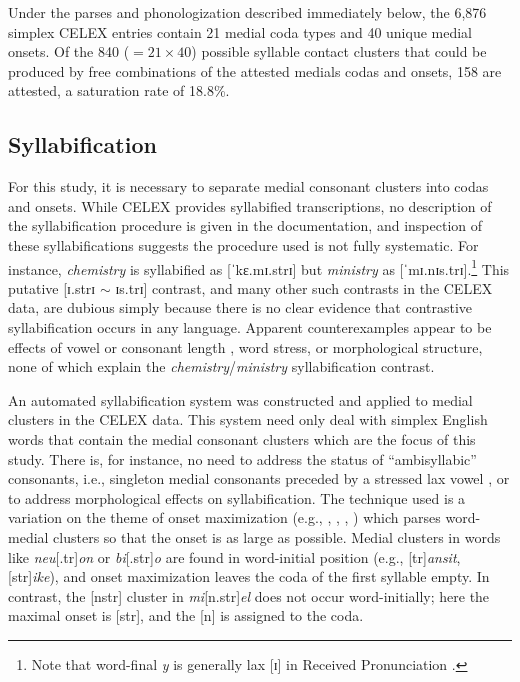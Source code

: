 \citet{Halle1962}


Under the parses and phonologization described immediately below, the 6,876 simplex CELEX entries contain 21 medial coda types and 40 unique medial onsets. Of the 840 ($= 21 \times 40$) possible syllable contact clusters that could be produced by free combinations of the attested medials codas and onsets, 158 are attested, a saturation rate of 18.8\%.

\subsection{Syllabification}

For this study, it is necessary to separate medial consonant clusters into codas and onsets. While CELEX provides syllabified transcriptions, no description of the syllabification procedure is given in the documentation, and inspection of these syllabifications suggests the procedure used is not fully systematic. For instance, \emph{chemistry} is syllabified as [ˈkɛ.mɪ.strɪ] but \emph{ministry} as [ˈmɪ.nɪs.trɪ].\footnote{Note that word-final \emph{y} is generally lax [ɪ] in Received Pronunciation \citep[][294]{AOE2}.} This putative [ɪ.strɪ $\sim$ ɪs.trɪ] contrast, and many other such contrasts in the CELEX data, are dubious simply because there is no clear evidence that contrastive syllabification occurs in any language. Apparent counterexamples appear to be effects of vowel or consonant length \citep[e.g.,][]{Elfner2006}, word stress, or morphological structure, none of which explain the \emph{chemistry}/\emph{ministry} syllabification contrast.

An automated syllabification system was constructed and applied to medial clusters in the CELEX data. This system need only deal with simplex English words that contain the medial consonant clusters which are the focus of this study.  There is, for instance, no need to address the status of ``ambisyllabic'' consonants, i.e., singleton medial consonants preceded by a stressed lax vowel \citep[][219f.]{Rubach1996}, or to address morphological effects on syllabification. The technique used is a variation on the theme of onset maximization (e.g., \citealt{Kurylowicz1948}, 
\citealt[75]{Pulgram1970}, \citealt[42f.]{Kahn1976}, \citealt[][358f.]{Selkirk1982b}) which parses word-medial clusters so that the onset is as large as possible. Medial clusters in words like \emph{neu}[.tr]\emph{on} or \emph{bi}[.str]\emph{o} are found in word-initial position (e.g., [tr]\emph{ansit}, [str]\emph{ike}), and onset maximization leaves the coda of the first syllable empty. In contrast, the [nstr] cluster in \emph{mi}[n.str]\emph{el} does not occur word-initially; here the maximal onset is [str], and the [n] is assigned to the coda.

